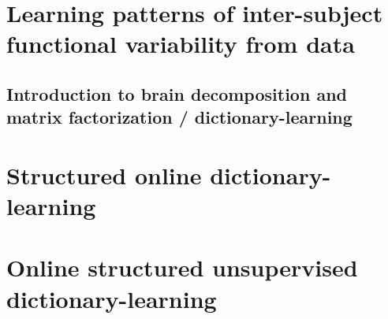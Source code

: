 
\chapter{Learning patterns of inter-subject functional variability from data}



\section{Introduction to brain decomposition and matrix factorization / dictionary-learning}

\chapter{Structured online dictionary-learning}
\chapter{Online structured unsupervised dictionary-learning}
\label{sec:online}
  

